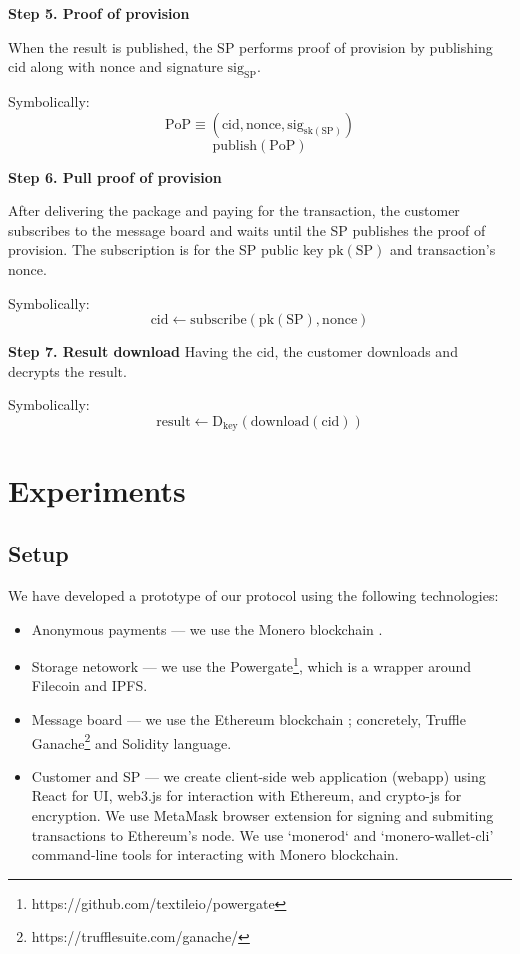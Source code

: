\documentclass{ieeeaccess}
\begin{document}
\noindent \textbf
{Step 5. Proof of provision}\label{step-5-proof-of-provision-publication}

When the result is published, the SP performs proof of provision by publishing $\mathrm{cid}$ along with $\mathrm{nonce}$ and signature $\mathrm{sig}_\mathrm{SP}$.

Symbolically: 
\[
\mathrm{PoP} \equiv (\mathrm{cid}, \mathrm{nonce}, \mathrm{sig}_{\mathrm{sk}(\mathrm{SP})})
\]
\[
\mathrm{publish}(\mathrm{PoP})
\]

\noindent \textbf
{Step 6. Pull proof of provision}\label{step-6-proof-of-provision-notification}

After delivering the package and paying for the transaction, the customer subscribes to the message board and waits until the SP publishes the proof of provision. The subscription is for the SP public key $\mathrm{pk}(\mathrm{SP})$ and transaction's $\mathrm{nonce}$.

Symbolically: 
\[
\mathrm{cid} \gets \mathrm{subscribe}(\mathrm{pk}(\mathrm{SP}), \mathrm{nonce})
\]

\noindent \textbf
{Step 7. Result download}\label{step-7-results-download} 
Having the $\mathrm{cid}$, the customer downloads and decrypts the $\mathrm{result}$.

Symbolically: 
\[
\mathrm{result} \gets \mathrm{D}_{\mathrm{key}}(\mathrm{download}(\mathrm{cid}))
\]

\section{Experiments}\label{sec:experiments}

\subsection*{Setup}

We have developed a prototype of our protocol using the following technologies:

\begin{itemize}
  \item{Anonymous payments} — we use the Monero blockchain \cite{noetherRingSignatureConfidential2015}.
  \item{Storage netowork} — we use the Powergate\footnote{https://github.com/textileio/powergate}, which is a wrapper around Filecoin and IPFS.
  \item{Message board} — we use the Ethereum blockchain \cite{woodEthereumSecureDecentralised2014}; concretely, Truffle Ganache\footnote{https://trufflesuite.com/ganache/} and Solidity language.
  \item{Customer and SP} — we create client-side web application (webapp) using React for UI, web3.js for interaction with Ethereum, and crypto-js for encryption. We use MetaMask browser extension for signing and submiting transactions to Ethereum's node. We use `monerod` and `monero-wallet-cli' command-line tools for interacting with Monero blockchain.
\end{itemize}
\end{document}
